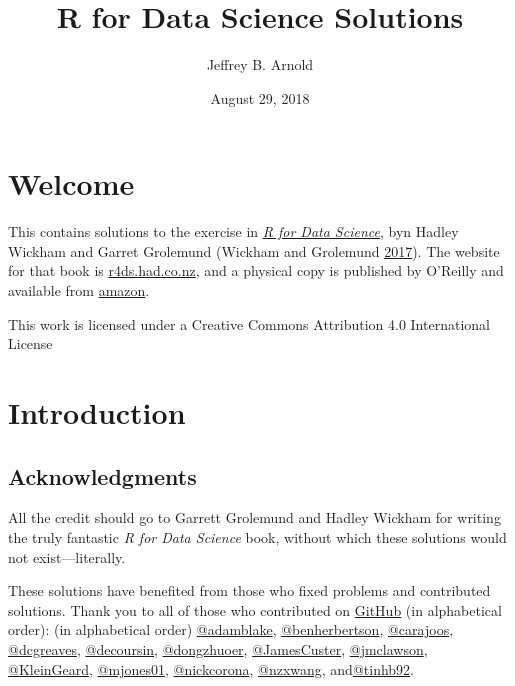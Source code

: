 \documentclass[]{book}
\title{R for Data Science Solutions}
\author{Jeffrey B. Arnold}
\date{August 29, 2018}
\theoremstyle{plain}
\theoremstyle{remark}
\begin{document}
\maketitle

{
\setcounter{tocdepth}{1}
\tableofcontents
}
\hypertarget{welcome}{%
\chapter*{Welcome}\label{welcome}}

This contains solutions to the exercise in
\href{http://amzn.to/2aHLAQ1}{\emph{R for Data Science}}, byn Hadley
Wickham and Garret Grolemund (Wickham and Grolemund
\protect\hyperlink{ref-WickhamGrolemund2017}{2017}). The website for
that book is \href{http://r4ds.had.co.nz/}{r4ds.had.co.nz}, and a
physical copy is published by O'Reilly and available from
\href{http://amzn.to/2aHLAQ1}{amazon}.

This work is licensed under a Creative Commons Attribution 4.0
International License

\hypertarget{introduction}{%
\chapter{Introduction}\label{introduction}}

\hypertarget{acknowledgments}{%
\section*{Acknowledgments}\label{acknowledgments}}

All the credit should go to Garrett Grolemund and Hadley Wickham for
writing the truly fantastic \emph{R for Data Science} book, without
which these solutions would not exist---literally.

These solutions have benefited from those who fixed problems and
contributed solutions. Thank you to all of those who contributed on
\href{https://github.com/jrnold/r4ds-exercise-solutions/graphs/contributors}{GitHub}
(in alphabetical order): (in alphabetical order)
\href{https://github.com/adamblake}{@adamblake},
\href{https://github.com/benherbertson}{@benherbertson},
\href{https://github.com/carajoos}{@carajoos},
\href{https://github.com/dcgreaves}{@dcgreaves},
\href{https://github.com/decoursin}{@decoursin},
\href{https://github.com/dongzhuoer}{@dongzhuoer},
\href{https://github.com/JamesCuster}{@JamesCuster},
\href{https://github.com/jmclawson}{@jmclawson},
\href{https://github.com/KleinGeard}{@KleinGeard},
\href{https://github.com/mjones01}{@mjones01},
\href{https://github.com/nickcorona}{@nickcorona},
\href{https://github.com/nzxwang}{@nzxwang},
and\href{https://github.com/tinhb92}{@tinhb92}.
\end{document}
